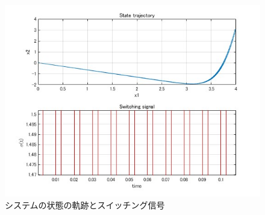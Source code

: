 \documentclass[10pt, fleqn, dvipdfmx]{article}
\begin{document}
\begin{figure}[h]
	\centering
	\includegraphics[width=0.7\linewidth]{./trajecctory_and_signal.jpg}
	\caption{システムの状態の軌跡とスイッチング信号}
	\label{fig-1}
\end{figure}
\end{document}
